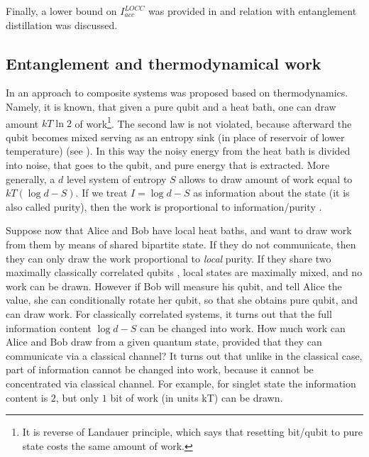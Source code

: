 \documentclass[rmp,12pt,preprint]{revtex4-2}
\begin{document}
Finally, a lower bound on $I_{acc}^{LOCC}$ was provided in
\cite{SenSL2006-Ilocc-bound} and relation with entanglement
distillation was discussed.



\subsection{Entanglement and thermodynamical work}
\label{sec:delta}

In \cite{OHHH2001} an approach to composite systems was proposed based
on thermodynamics. Namely, it is known, that given a pure qubit and a
heat bath, one can draw amount $kT\ln 2$ of work\footnote{It is
  reverse of Landauer principle, which says that resetting bit/qubit
  to pure state costs the same amount of work.}. The second law is not
violated, because afterward the qubit becomes mixed serving as an
entropy sink (in place of reservoir of lower temperature) (see
\cite{Vedral1999,Scully-negentropy,silnik}).  In this way the noisy
energy from the heat bath is divided into noise, that goes to the
qubit, and pure energy that is extracted.  More generally, a $d$ level
system of entropy $S$ allows to draw amount of work equal to $kT (\log
d -S)$. If we treat $I=\log d -S$ as information about the state (it
is also called purity), then the work is proportional to
information/purity \cite{igor-deficit}.


Suppose now that Alice and Bob have local heat baths, and want to draw
work from them by means of shared bipartite state. If they do not
communicate, then they can only draw the work proportional to {\it
  local} purity. If they share two maximally classically correlated
qubits ,
local states are maximally mixed, and no work can be
drawn. However if Bob will measure his qubit, and tell Alice the
value, she can conditionally rotate her qubit, so that she obtains
pure qubit, and can draw work. For classically correlated systems, it
turns out that the full information content $\log d -S$ can be changed
into work. How much work can Alice and Bob draw from a given quantum
state, provided that they can communicate via a classical channel? It
turns out that unlike in the classical case, part of information
cannot be changed into work, because it cannot be concentrated via
classical channel. For example, for singlet state the information
content is $2$, but only $1$ bit of work (in units kT) can be drawn.
\end{document}
